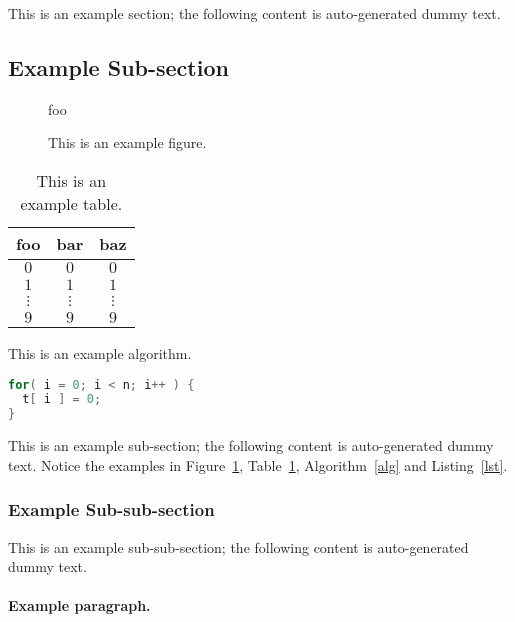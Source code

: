 \documentclass[ %
                    author={Dillon Keith Diep},
                supervisor={Dr. Carl Henrik Ek},
                    degree={MEng},
                     title={Assisted Content Generation for 3D Hair Geometry},
                  subtitle={[INCOMPLETE DRAFT, CONTAINS NOTES FROM RESEARCH]},
                      type={Research},
                      year={2014} ]{dissertation}
\begin{document}
This is an example section; 
the following content is auto-generated dummy text.
\lipsum

\subsection{Example Sub-section}

\begin{figure}[t]
\centering
foo
\caption{This is an example figure.}
\label{fig}
\end{figure}

\begin{table}[t]
\centering
\begin{tabular}{|cc|c|}
\hline
foo      & bar      & baz      \\
\hline
$0     $ & $0     $ & $0     $ \\
$1     $ & $1     $ & $1     $ \\
$\vdots$ & $\vdots$ & $\vdots$ \\
$9     $ & $9     $ & $9     $ \\
\hline
\end{tabular}
\caption{This is an example table.}
\label{tab}
\end{table}

\begin{algorithm}[t]
\caption{This is an example algorithm.}
\label{alg}
\end{algorithm}

\begin{lstlisting}[float={t},caption={This is an example listing.},label={lst},language=C]
for( i = 0; i < n; i++ ) {
  t[ i ] = 0;
}
\end{lstlisting}

This is an example sub-section;
the following content is auto-generated dummy text.
Notice the examples in Figure~\ref{fig}, Table~\ref{tab}, Algorithm~\ref{alg}
and Listing~\ref{lst}.
\lipsum

\subsubsection{Example Sub-sub-section}

This is an example sub-sub-section;
the following content is auto-generated dummy text.
\lipsum

\paragraph{Example paragraph.}
\end{document}
